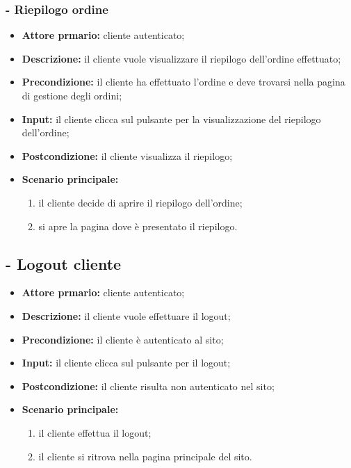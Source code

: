 \subsubsection{ - Riepilogo ordine}
\begin{itemize}
    \item \textbf{Attore prmario:} cliente autenticato;
    \item \textbf{Descrizione:} il cliente vuole visualizzare il riepilogo dell'ordine effettuato;
    \item \textbf{Precondizione:} il cliente ha effettuato l'ordine e deve trovarsi nella pagina di gestione degli ordini;
    \item \textbf{Input:} il cliente clicca sul pulsante per la visualizzazione del riepilogo dell'ordine;
    \item \textbf{Postcondizione:} il cliente visualizza il riepilogo;
    \item \textbf{Scenario principale:}
          \begin{enumerate}
              \item il cliente decide di aprire il riepilogo dell'ordine;
              \item si apre la pagina dove è presentato il riepilogo.
          \end{enumerate}
\end{itemize}

\stepUserCase
\subsection{ - Logout cliente}
\begin{itemize}
    \item \textbf{Attore prmario:} cliente autenticato;
    \item \textbf{Descrizione:} il cliente vuole effettuare il logout;
    \item \textbf{Precondizione:} il cliente è autenticato al sito;
    \item \textbf{Input:} il cliente clicca sul pulsante per il logout;
    \item \textbf{Postcondizione:} il cliente risulta non autenticato nel sito;
    \item \textbf{Scenario principale:}
          \begin{enumerate}
              \item il cliente effettua il logout;
              \item il cliente si ritrova nella pagina principale del sito.
          \end{enumerate}
\end{itemize}

